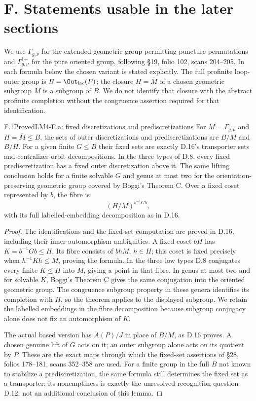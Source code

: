 \section{F. Statements usable in the later sections}

We use $\Gamma_{g,\nu}$ for the extended geometric group permitting puncture permutations and $\Gamma_{g,\nu}^{!+}$ for the pure oriented group, following \S19, folio 102, scans 204--205. In each formula below the chosen variant is stated explicitly. The full profinite loop-outer group is $B=\Out_{\rm lac}(P)$; the closure $H=\overline M$ of a chosen geometric subgroup $M$ is a subgroup of $B$. We do not identify that closure with the abstract profinite completion without the congruence assertion required for that identification.

\begin{claim}{F.1}{Proved}{LM4-F.a: fixed discretizations and prediscretizations}
\label{LM4-F.a}
For $M=\Gamma_{g,\nu}$ and $H=\overline M\leq B$, the sets of outer discretizations and prediscretizations are $B/M$ and $B/H$. For a given finite $G\leq B$ their fixed sets are exactly D.16's transporter sets and centralizer-orbit decompositions. In the three types of D.8, every fixed prediscretization has a fixed outer discretization above it. The same lifting conclusion holds for a finite solvable $G$ and genus at most two for the orientation-preserving geometric group covered by Boggi's Theorem C. Over a fixed coset represented by $b$, the fibre is
\[
 (H/M)^{b^{-1}Gb},
\]
with its full labelled-embedding decomposition as in D.16.
\end{claim}
\begin{proof}
The identifications and the fixed-set computation are proved in D.16, including their inner-automorphism ambiguities. A fixed coset $bH$ has $K=b^{-1}Gb\leq H$. Its fibre consists of $bhM$, $h\in H$; this coset is fixed precisely when $h^{-1}Kh\leq M$, proving the formula. In the three low types D.8 conjugates every finite $K\leq H$ into $M$, giving a point in that fibre. In genus at most two and for solvable $K$, Boggi's Theorem C \cite{R-Boggi} gives the same conjugation into the oriented geometric group. The congruence subgroup property in these genera identifies its completion with $H$, so the theorem applies to the displayed subgroup. We retain the labelled embeddings in the fibre decomposition because subgroup conjugacy alone does not fix an automorphism of $K$.

The actual based version has $A(P)/J$ in place of $B/M$, as D.16 proves. A chosen genuine lift of $G$ acts on it; an outer subgroup alone acts on its quotient by $P$. These are the exact maps through which the fixed-set assertions of \S28, folios 178--181, scans 352--358 are used. For a finite group in the full $B$ not known to stabilize a prediscretization, the same formula still determines the fixed set as a transporter; its nonemptiness is exactly the unresolved recognition question D.12, not an additional conclusion of this lemma.
\end{proof}

